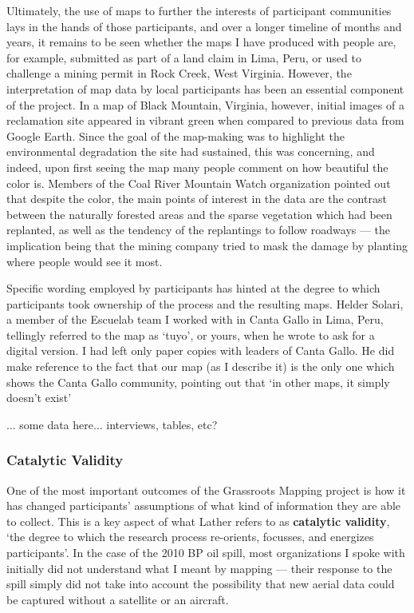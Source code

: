 \documentclass[11pt]{report}
\begin{document}
Ultimately, the use of maps to further the interests of participant communities lays in the hands of those participants, and over a longer timeline of months and years, it remains to be seen whether the maps I have produced with people are, for example, submitted as part of a land claim in Lima, Peru, or used to challenge a mining permit in Rock Creek, West Virginia. However, the interpretation of map data by local participants has been an essential component of the project. In a map of Black Mountain, Virginia, however, initial images of a reclamation site appeared in vibrant green when compared to previous data from Google Earth. Since the goal of the map-making was to highlight the environmental degradation the site had sustained, this was concerning, and indeed, upon first seeing the map many people comment on how beautiful the color is. Members of the Coal River Mountain Watch organization pointed out that despite the color, the main points of interest in the data are the contrast between the naturally forested areas and the sparse vegetation which had been replanted, as well as the tendency of the replantings to follow roadways --- the implication being that the mining company tried to mask the damage by planting where people would see it most.  

Specific wording employed by participants has hinted at the degree to which participants took ownership of the process and the resulting maps. Helder Solari, a member of the Escuelab team I worked with in Canta Gallo in Lima, Peru, tellingly referred to the map as `tuyo', or yours, when he wrote to ask for a digital version. I had left only paper copies with leaders of Canta Gallo. He did make reference to the fact that our map (as I describe it) is the only one which shows the Canta Gallo community, pointing out that `in other maps, it simply doesn't exist' \cite{solari2010cantagallo}

... some data here... interviews, tables, etc?

\subsubsection{Catalytic Validity}

One of the most important outcomes of the Grassroots Mapping project is how it has changed participants' assumptions of what kind of information they are able to collect. This is a key aspect of what Lather refers to as \textbf{catalytic validity}, `the degree to which the research process re-orients, focusses, and energizes participants'. In the case of the 2010 BP oil spill, most organizations I spoke with initially did not understand what I meant by mapping --- their response to the spill simply did not take into account the possibility that new aerial data could be captured without a satellite or an aircraft. 
\end{document}
